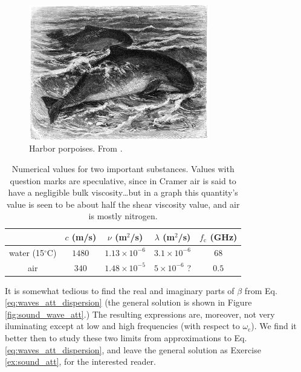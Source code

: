 \begin{figure}
  \begin{center}
    \includegraphics[width=0.7\textwidth]{figures/porpoises}
  \end{center}
  \caption{Harbor porpoises. From \cite{Brehms_Tierleben}.  \label{fig:porpoises}}
\end{figure}


\begin{table}
\begin{tabular}{|c|c|c|c|c|}
  \hline
    & $ c$ (m/s) &  $ \nu$ (m$^2$/s) & $\lambda$ (m$^2$/s) & $ f_\mathrm{c}$ (GHz)\\
  \hline
  \hline
  water (15$^\circ$C) & $1480$& $ 1.13 \times 10^{-6}$ & $ 3.1 \times 10^{-6}$ & $68$ \\
  \hline
  air & $340$   & $ 1.48\times 10^{-5}$ & $ 5 \times 10^{-6}$ ? & $0.5$ \\
  \hline
\end{tabular}
\caption{Numerical values for two important substances. Values with
  question marks are speculative, since in Cramer\cite{Cramer} air is
  said to have a negligible bulk viscosity\ldots but in a graph this
  quantity's value is seen to be about half the shear viscosity value,
  and air is mostly nitrogen.
 \label{tbl:sound_att}}
\end{table}

It is somewhat tedious to find the real and imaginary parts of $\beta$
from Eq. \ref{eq:waves_att_dispersion} (the general solution is shown
in Figure \ref{fig:sound_wave_att}.)  The resulting expressions are,
moreover, not very iluminating except at low and high frequencies
(with respect to $\omega_\mathrm{c}$). We find it better then to study
these two limits from approximations to
Eq. \ref{eq:waves_att_dispersion}, and leave the general solution as
Exercise \ref{ex:sound_att}, for the interested reader.

